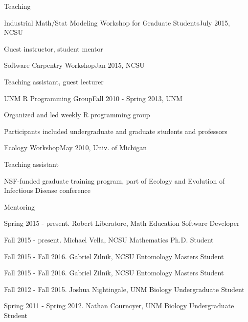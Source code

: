 \documentclass{resume} %
\begin{document}
\begin{rSection}{Teaching}
\begin{rSubsection}{Industrial Math/Stat Modeling Workshop for Graduate Students}{July 2015, NCSU}{}{}
\item Guest instructor, student mentor
\end{rSubsection}
\begin{rSubsection}{Software Carpentry Workshop}{Jan 2015, NCSU}{}{}
\item Teaching assistant, guest lecturer
\end{rSubsection}
\begin{rSubsection}{UNM R Programming Group}{Fall 2010 - Spring 2013, UNM}{}{}
\item Organized and led weekly R programming group
\item Participants included undergraduate and graduate students and professors
\end{rSubsection}
\begin{rSubsection}{Ecology Workshop}{May 2010, Univ. of Michigan}{}{}
\item Teaching assistant
\item NSF-funded graduate training program, part of Ecology and Evolution of Infectious
Disease conference
\end{rSubsection}
\end{rSection}

\newpage

\begin{rSection}{Mentoring}
\item Spring 2015 - present. Robert Liberatore, Math Education Software Developer
\item Fall 2015 - present. Michael Vella, NCSU Mathematics Ph.D. Student
\item Fall 2015 - Fall 2016. Gabriel Zilnik, NCSU Entomology Masters Student
\item Fall 2015 - Fall 2016. Gabriel Zilnik, NCSU Entomology Masters Student
\item Fall 2012 - Fall 2015. Joshua Nightingale, UNM Biology Undergraduate Student
\item Spring 2011 - Spring 2012. Nathan Cournoyer, UNM Biology Undergraduate Student
\end{rSection}

\end{document}
